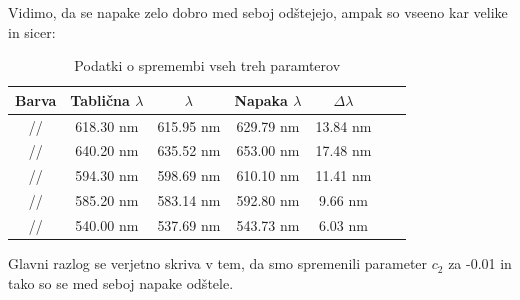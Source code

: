 \documentclass[11pt, a4paper]{article}
\theoremstyle{definition}
\theoremstyle{example}
\theoremstyle{izrek}
\begin{document}
Vidimo, da se napake zelo dobro med seboj odštejejo, ampak so vseeno kar velike in sicer:
\begin{table}[H]
	\centering
	\begin{tabular}{|c|c|c|c|c|c|c|}
	\hline
	Barva & Tablična $\lambda$ & $\lambda$ & Napaka $\lambda$ & $\Delta \lambda$ \\ 
\hline
\hline
 // & 618.30 nm & 615.95 nm & 629.79 nm & 13.84 nm \\ 
\hline
 // & 640.20 nm & 635.52 nm & 653.00 nm & 17.48 nm \\ 
\hline
 // & 594.30 nm & 598.69 nm & 610.10 nm & 11.41 nm \\ 
\hline
 // & 585.20 nm & 583.14 nm & 592.80 nm & 9.66 nm \\ 
\hline
 // & 540.00 nm & 537.69 nm & 543.73 nm & 6.03 nm \\ 
\hline
\end{tabular}
	\caption{Podatki o spremembi vseh treh paramterov}	
\end{table}
Glavni razlog se verjetno skriva v tem, da smo spremenili parameter $c_2$ za -0.01 in tako so se med seboj napake odštele.
\end{document}
